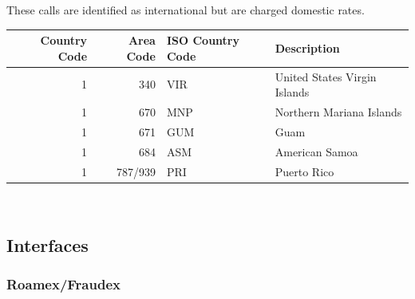 \documentclass[12pt,twoside]{article}
\begin{document}
   These calls are identified as international but are charged domestic rates.
\footnotesize

\begin{center}
\begin{tabular}{rrll}
\hline
 Country Code  &  Area Code  &  ISO Country Code  &  Description                   \\
\hline
            1  &        340  &  VIR               &  United States Virgin Islands  \\
            1  &        670  &  MNP               &  Northern Mariana Islands      \\
            1  &        671  &  GUM               &  Guam                          \\
            1  &        684  &  ASM               &  American Samoa                \\
            1  &    787/939  &  PRI               &  Puerto Rico                   \\
\hline
\end{tabular}
\end{center}


\normalsize
\\
\subsection{Interfaces}
\label{sec-6-8}
\subsubsection{Roamex/Fraudex}
\label{sec-6-8-1}
\end{document}
